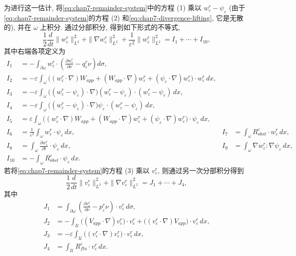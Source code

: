 \begin{sloppypar}
为进行这一估计, 将\eqref{eq:chap7-remainder-system}中的方程 (1) 乘以 $w_\varepsilon^r-\psi_\varepsilon$ (由于\eqref{eq:chap7-remainder-system}的方程 (2) 和\eqref{eq:chap7-divergence-lifting}, 它是无散的), 并在 $\omega$ 上积分. 通过分部积分, 得到如下形式的不等式,
\begin{equation}
 \frac12\frac d{dt}\|w_\varepsilon^r\|_{L^2}^2
 +\|\nabla w_\varepsilon^r\|_{L^2}^2
 +\frac1{\varepsilon^2}\|w_\varepsilon^r\|_{L^2}^2
 =I_1+\cdots+I_{10},
\label{eq:chap7-obstacle-remainder-energy}
\end{equation}
其中右端各项定义为
\[
\begin{aligned}
 I_1&=-\int_{\partial\omega}w_\varepsilon^r\cdot
 \left(\frac{\partial w_\varepsilon^r}{\partial\nu}-q_\varepsilon^r\nu\right)d\sigma,\\
 I_2&=-\varepsilon\int_\omega\bigl((w_\varepsilon^r\cdot\nabla)W_{app}
 +(W_{app}\cdot\nabla)w_\varepsilon^r
 +(\psi_\varepsilon\cdot\nabla)w_\varepsilon^r\bigr)\cdot w_\varepsilon^r\,dx,\\
 I_3&=-\varepsilon\int_\omega\bigl((w_\varepsilon^r-\psi_\varepsilon)\cdot\nabla\bigr)
 (w_\varepsilon^r-\psi_\varepsilon)\cdot(w_\varepsilon^r-\psi_\varepsilon)\,dx,\\
 I_4&=-\varepsilon\int_\omega\bigl((w_\varepsilon^r-\psi_\varepsilon)\cdot\nabla\bigr)
 \psi_\varepsilon\cdot(w_\varepsilon^r-\psi_\varepsilon)\,dx,\\
 I_5&=\varepsilon\int_\omega\bigl((w_\varepsilon^r\cdot\nabla)W_{app}
 +(W_{app}\cdot\nabla)w_\varepsilon^r
 +(\psi_\varepsilon\cdot\nabla)w_\varepsilon^r\bigr)\cdot\psi_\varepsilon\,dx,\\
 I_6&=\frac1{\varepsilon^2}\int_\omega w_\varepsilon^r\cdot\psi_\varepsilon\,dx,
 &I_7&=\int_\omega R_{obst}^\varepsilon\cdot w_\varepsilon^r\,dx,\\
 I_8&=\int_\omega\frac{\partial w_\varepsilon^r}{\partial t}\cdot\psi_\varepsilon\,dx,
 &I_9&=\int_\omega\nabla w_\varepsilon^r:\nabla\psi_\varepsilon\,dx,\\
 I_{10}&=-\int_\omega R_{obst}^\varepsilon\cdot\psi_\varepsilon\,dx.
\end{aligned}
\]
若将\eqref{eq:chap7-remainder-system}的方程 (3) 乘以 $v_\varepsilon^r$, 则通过另一次分部积分得到
\begin{equation}
 \frac12\frac d{dt}\|v_\varepsilon^r\|_{L^2}^2
 +\|\nabla v_\varepsilon^r\|_{L^2}^2
 =J_1+\cdots+J_4,
\label{eq:chap7-fluid-remainder-energy}
\end{equation}
其中
\[
\begin{aligned}
 J_1&=\int_{\partial\omega}\left(\frac{\partial v_\varepsilon^r}{\partial\nu}
 -p_\varepsilon^r\nu\right)\cdot v_\varepsilon^r\,d\sigma,\\
 J_2&=-\int_\mathcal U\bigl((V_{app}\cdot\nabla)v_\varepsilon^r\bigr)\cdot v_\varepsilon^r
 +\bigl((v_\varepsilon^r\cdot\nabla)V_{app}\bigr)\cdot v_\varepsilon^r\,dx,\\
 J_3&=-\varepsilon\int_\mathcal U\bigl((v_\varepsilon^r\cdot\nabla)v_\varepsilon^r\bigr)\cdot v_\varepsilon^r\,dx,\\
 J_4&=\int_\mathcal U R_{flu}^\varepsilon\cdot v_\varepsilon^r\,dx.
\end{aligned}
\]

\MBChapterSevenFinalRemainderEstimates

\end{sloppypar}
